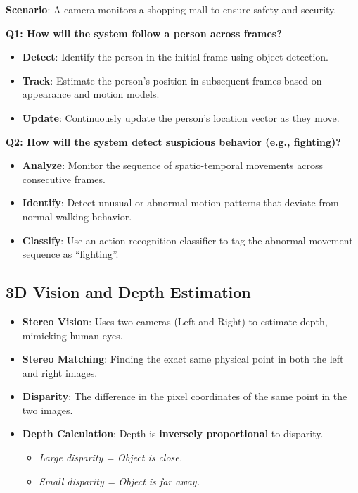 \documentclass[11pt,a4paper]{article}
\begin{document}
\begin{tcolorbox}[colback=green!5!white,colframe=green!50!black,title=\textbf{Case Study: CCTV Surveillance System}]
\textbf{Scenario}: A camera monitors a shopping mall to ensure safety and security.

\textbf{Q1: How will the system follow a person across frames?}
\begin{itemize}
    \item \textbf{Detect}: Identify the person in the initial frame using object detection.
    \item \textbf{Track}: Estimate the person's position in subsequent frames based on appearance and motion models.
    \item \textbf{Update}: Continuously update the person's location vector as they move.
\end{itemize}

\textbf{Q2: How will the system detect suspicious behavior (e.g., fighting)?}
\begin{itemize}
    \item \textbf{Analyze}: Monitor the sequence of spatio-temporal movements across consecutive frames.
    \item \textbf{Identify}: Detect unusual or abnormal motion patterns that deviate from normal walking behavior.
    \item \textbf{Classify}: Use an action recognition classifier to tag the abnormal movement sequence as ``fighting''.
\end{itemize}
\end{tcolorbox}

\subsection{3D Vision and Depth Estimation}

\begin{itemize}
    \item \textbf{Stereo Vision}: Uses two cameras (Left and Right) to estimate depth, mimicking human eyes.
    \item \textbf{Stereo Matching}: Finding the exact same physical point in both the left and right images.
    \item \textbf{Disparity}: The difference in the pixel coordinates of the same point in the two images.
    \item \textbf{Depth Calculation}: Depth is \textbf{inversely proportional} to disparity.
    \begin{itemize}
        \item \textit{Large disparity = Object is close.}
        \item \textit{Small disparity = Object is far away.}
    \end{itemize}
\end{itemize}
\end{document}
